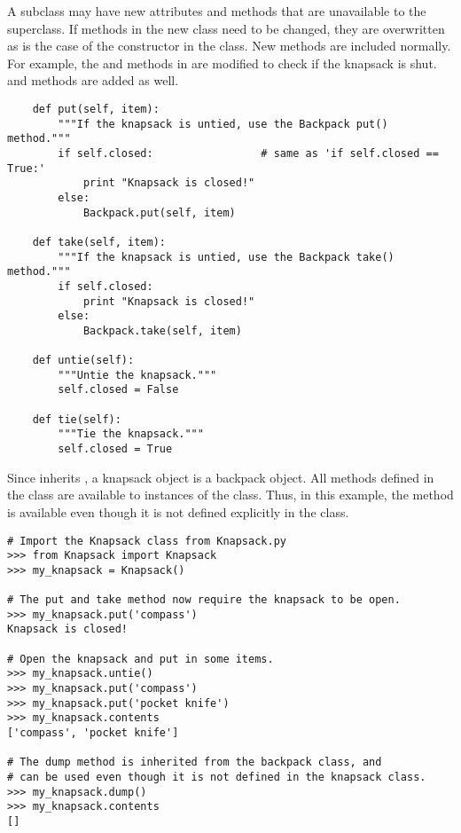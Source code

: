 A subclass may have new attributes and methods that are unavailable to the superclass.
If methods in the new class need to be changed, they are overwritten as is the case of the constructor in the  class.
New methods are included normally.
For example, the  and  methods in  are modified to check if the knapsack is shut. 
 and  methods are added as well.

\begin{lstlisting}
    def put(self, item):
        """If the knapsack is untied, use the Backpack put() method."""
        if self.closed:					# same as 'if self.closed == True:'
            print "Knapsack is closed!"
        else:
            Backpack.put(self, item)
    
    def take(self, item):
        """If the knapsack is untied, use the Backpack take() method."""
        if self.closed:
            print "Knapsack is closed!"
        else:
            Backpack.take(self, item)
    
    def untie(self):
        """Untie the knapsack."""
        self.closed = False
    
    def tie(self):
        """Tie the knapsack."""
        self.closed = True
\end{lstlisting}

Since  inherits , a knapsack object is a backpack object.
All methods defined in the  class are available to instances of the  class.
Thus, in this example, the  method is available even though it is not defined explicitly in the  class.

\begin{lstlisting}
# Import the Knapsack class from Knapsack.py
>>> from Knapsack import Knapsack
>>> my_knapsack = Knapsack()

# The put and take method now require the knapsack to be open.
>>> my_knapsack.put('compass')
Knapsack is closed!

# Open the knapsack and put in some items.
>>> my_knapsack.untie()
>>> my_knapsack.put('compass')
>>> my_knapsack.put('pocket knife')
>>> my_knapsack.contents
['compass', 'pocket knife']

# The dump method is inherited from the backpack class, and
# can be used even though it is not defined in the knapsack class.
>>> my_knapsack.dump()
>>> my_knapsack.contents
[]
\end{lstlisting}

